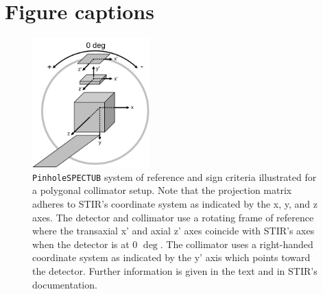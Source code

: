\documentclass[utf8]{FrontiersinHarvard} %
\begin{document}
\section*{Figure captions}


\begin{figure}[h!]
\setcounter{figure}{0}
\begin{center}
\includegraphics[height=5cm]{Figures/STIR-UsersGuide_PinholeSPECTUB}
\end{center}
\caption{\texttt{PinholeSPECTUB} system of reference and sign criteria illustrated for a polygonal collimator setup. Note that the projection matrix adheres to STIR's coordinate system as indicated by the x, y, and z axes. The detector and collimator use a rotating frame of reference where the transaxial x' and axial z' axes coincide with STIR's axes when the detector is at 0 $\mathrm{\deg}$. The collimator uses a right-handed coordinate system as indicated by the y' axis which points toward the detector. Further information is given in the text and in STIR's documentation.}\label{fig:PinholeSPECTUB_coords}
\end{figure}
\end{document}
